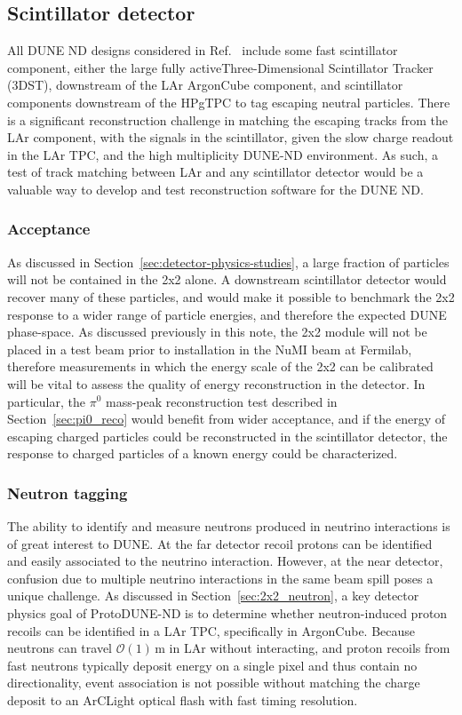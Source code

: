 \subsection{Scintillator detector}
\label{sec:minerva}
All DUNE ND designs considered in Ref.~\cite{dune_ndcsg} include some fast scintillator component, either the large fully activeThree-Dimensional Scintillator Tracker (3DST), downstream of the LAr ArgonCube component, and scintillator components downstream of the HPgTPC to tag escaping neutral particles. There is a significant reconstruction challenge in matching the escaping tracks from the LAr component, with the signals in the scintillator, given the slow charge readout in the LAr TPC, and the high multiplicity DUNE-ND environment. As such, a test of track matching between LAr and any scintillator detector would be a valuable way to develop and test reconstruction software for the DUNE ND.

\subsubsection{Acceptance}
As discussed in Section~\ref{sec:detector-physics-studies}, a large fraction of particles will not be contained in the 2x2 alone. A downstream scintillator detector would recover many of these particles, and would make it possible to benchmark the 2x2 response to a wider range of particle energies, and therefore the expected DUNE phase-space. As discussed previously in this note, the 2x2 module will not be placed in a test beam prior to installation in the NuMI beam at Fermilab, therefore measurements in which the energy scale of the 2x2 can be calibrated will be vital to assess the quality of energy reconstruction in the detector. In particular, the $\pi^{0}$ mass-peak reconstruction test described in Section~\ref{sec:pi0_reco} would benefit from wider acceptance, and if the energy of escaping charged particles could be reconstructed in the scintillator detector, the response to charged particles of a known energy could be characterized.

\subsubsection{Neutron tagging}
The ability to identify and measure neutrons produced in neutrino interactions is of great interest to DUNE.  At the far detector recoil protons can be identified and easily associated to the neutrino interaction.  However, at the near detector, confusion due to multiple neutrino interactions in the same beam spill poses a unique challenge.  As discussed in Section~\ref{sec:2x2_neutron}, a key detector physics goal of ProtoDUNE-ND is to determine whether neutron-induced proton recoils can be identified in a LAr TPC, specifically in ArgonCube. Because neutrons can travel $\mathcal{O}\left(1\right)\,\mathrm{m}$ in LAr without interacting, and proton recoils from fast neutrons typically deposit energy on a single pixel and thus contain no directionality, event association is not possible without matching the charge deposit to an ArCLight optical flash with fast timing resolution.
 
